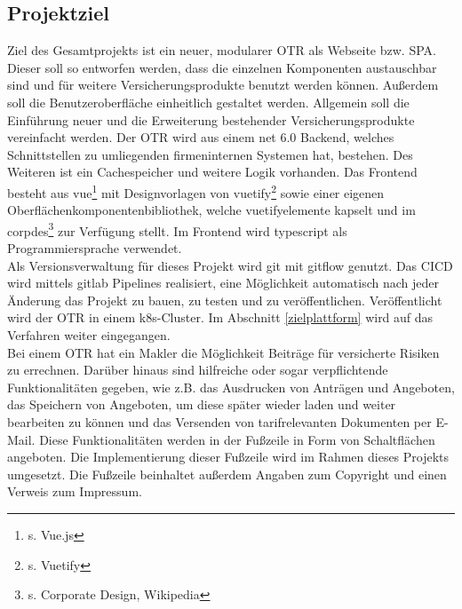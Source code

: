 \subsection{Projektziel}
\label{projektziel}
Ziel des Gesamtprojekts ist ein neuer, modularer \ac{OTR} als Webseite bzw. \ac{SPA}. Dieser soll so entworfen werden, dass die einzelnen Komponenten austauschbar sind und für weitere Versicherungsprodukte benutzt werden können. Außerdem soll die Benutzeroberfläche einheitlich gestaltet werden. Allgemein soll die Einführung neuer und die Erweiterung bestehender Versicherungsprodukte vereinfacht werden. Der \ac{OTR} wird aus einem \gls{net} 6.0 Backend, welches Schnittstellen zu umliegenden firmeninternen Systemen hat, bestehen. Des Weiteren ist ein Cachespeicher und weitere Logik vorhanden. Das Frontend besteht aus \gls{vue}\footnote{s.\cite{Vue2022} Vue.js} mit Designvorlagen von \gls{vuetify}\footnote{s.\cite{Vuetify2022} Vuetify} sowie einer eigenen Oberflächenkomponentenbibliothek, welche \gls{vuetify}elemente kapselt und im \gls{corpdes}\footnote{s.\cite{CorporateDesign2021} Corporate Design, Wikipedia} zur Verfügung stellt. Im Frontend wird \gls{typescript} als Programmiersprache verwendet.\\
Als Versionsverwaltung für dieses Projekt wird \gls{git} mit \gls{gitflow} genutzt. Das \ac{CICD} wird mittels \gls{gitlab} Pipelines realisiert, eine Möglichkeit automatisch nach jeder Änderung das Projekt zu bauen, zu testen und zu veröffentlichen. Veröffentlicht wird der \ac{OTR} in einem \gls{k8s}-Cluster. Im Abschnitt \ref{zielplattform}  wird auf das Verfahren weiter eingegangen.
\\
Bei einem \ac{OTR} hat ein Makler die Möglichkeit Beiträge für versicherte Risiken zu errechnen. Darüber hinaus sind hilfreiche oder sogar verpflichtende Funktionalitäten gegeben, wie z.B. das Ausdrucken von Anträgen und Angeboten, das Speichern von Angeboten, um diese später wieder laden und weiter bearbeiten zu können und das Versenden von tarifrelevanten Dokumenten per E-Mail. Diese Funktionalitäten werden in der Fußzeile in Form von Schaltflächen angeboten. Die Implementierung dieser Fußzeile wird im Rahmen dieses Projekts umgesetzt. Die Fußzeile beinhaltet außerdem Angaben zum Copyright und einen Verweis zum Impressum.
\\


